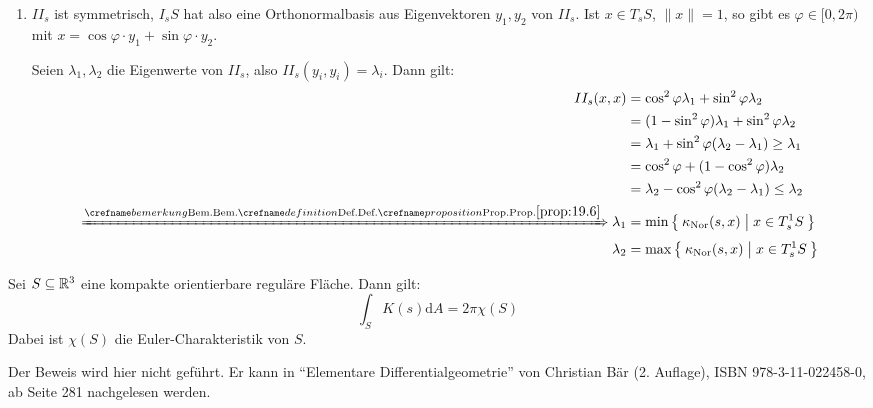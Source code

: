 \begin{beweis}\leavevmode
    \begin{enumerate}[label=\alph*)]
        \item $II_s$ ist symmetrisch, $I_s S$ hat also eine Orthonormalbasis aus
              Eigenvektoren $y_1, y_2$ von $II_s$. Ist $x \in T_s S$, $\|x\| = 1$,
              so gibt es $\varphi \in [0,2\pi)$ mit $x = \cos \varphi \cdot y_1 + \sin \varphi \cdot y_2$.

              Seien $\lambda_1, \lambda_2$ die Eigenwerte von $II_s$, also
              $II_s(y_i, y_i) = \lambda_i$. Dann gilt:
              \begin{align*}
                  II_s (x,x) &= \cos^2 \varphi \lambda_1 + \sin^2 \varphi \lambda_2\\
                  &= (1- \sin^2 \varphi) \lambda_1 + \sin^2 \varphi \lambda_2\\
                  &= \lambda_1 + \sin^2 \varphi (\lambda_2 - \lambda_1) \geq \lambda_1\\
                  &= \cos^2 \varphi + (1 - \cos^2 \varphi) \lambda_2\\
                  &= \lambda_2 - \cos^2 \varphi (\lambda_2 - \lambda_1) \leq \lambda_2\\
                  \xRightarrow{\crefabbr{prop:19.6}} \lambda_1 &= \min \Set{\kappanor (s,x) | x \in T^1_s S}\\
                  \lambda_2 &= \max \Set{\kappanor (s,x) | x \in T^1_s S}
              \end{align*}
    \end{enumerate}
\end{beweis}

\begin{satz}%
    Sei $S \subseteq \mathbb{R}^3$ eine kompakte orientierbare reguläre Fläche. Dann gilt:
    \[\int_S K(s) \mathrm{d}A = 2 \pi \chi(S)\]
    Dabei ist $\chi(S)$ die Euler-Charakteristik von $S$.
\end{satz}

\begin{beweis}
    Der Beweis wird hier nicht geführt. Er kann in \enquote{Elementare Differentialgeometrie}
    von Christian Bär (2. Auflage), ISBN 978-3-11-022458-0, ab Seite 281 nachgelesen werden.
\end{beweis}